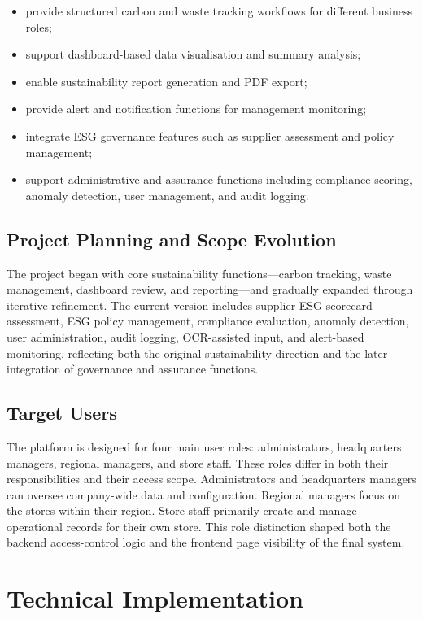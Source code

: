 \documentclass[11pt,a4paper]{article}
\begin{document}
\begin{itemize}[leftmargin=1.4em,itemsep=2pt,topsep=2pt]
    \item provide structured carbon and waste tracking workflows for different business roles;
    \item support dashboard-based data visualisation and summary analysis;
    \item enable sustainability report generation and PDF export;
    \item provide alert and notification functions for management monitoring;
    \item integrate ESG governance features such as supplier assessment and policy management;
    \item support administrative and assurance functions including compliance scoring, anomaly detection, user management, and audit logging.
\end{itemize}

\subsection{Project Planning and Scope Evolution}
The project began with core sustainability functions---carbon tracking, waste management, dashboard review, and reporting---and gradually expanded through iterative refinement. The current version includes supplier ESG scorecard assessment, ESG policy management, compliance evaluation, anomaly detection, user administration, audit logging, OCR-assisted input, and alert-based monitoring, reflecting both the original sustainability direction and the later integration of governance and assurance functions.

\subsection{Target Users}
The platform is designed for four main user roles: administrators, headquarters managers, regional managers, and store staff. These roles differ in both their responsibilities and their access scope. Administrators and headquarters managers can oversee company-wide data and configuration. Regional managers focus on the stores within their region. Store staff primarily create and manage operational records for their own store. This role distinction shaped both the backend access-control logic and the frontend page visibility of the final system.

\section{Technical Implementation}
\end{document}
